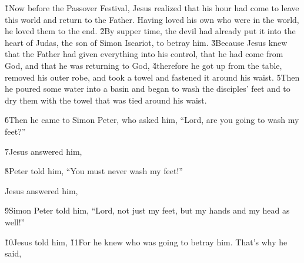 \v{1}Now before the Passover Festival, Jesus realized that his hour had come to leave this world and return to the Father. Having loved his own who were in the world, he loved them to the end. \v{2}By supper time, the devil had already put it into the heart of Judas, the son of Simon Iscariot, to betray him. \v{3}Because Jesus knew that the Father had given everything into his control, that he had come from God, and that he was returning to God, \v{4}therefore he got up from the table, removed his outer robe, and took a towel and fastened it around his waist. \v{5}Then he poured some water into a basin and began to wash the disciples' feet and to dry them with the towel that was tied around his waist.

\v{6}Then he came to Simon Peter, who asked him, ``Lord, are you going to wash my feet?''

\v{7}Jesus answered him, 

\v{8}Peter told him, ``You must never wash my feet!''

Jesus answered him, 

\v{9}Simon Peter told him, ``Lord, not just my feet, but my hands and my head as well!''

\v{10}Jesus told him,   \v{11}For he knew who was going to betray him. That's why he said, 

